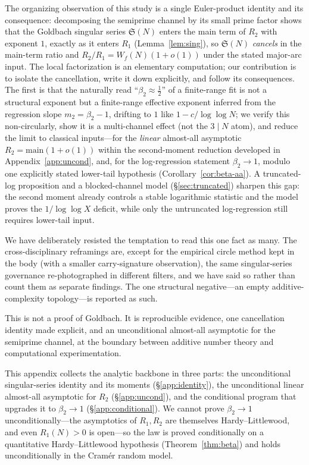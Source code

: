 \documentclass[]{interact}%
\newcommand{\sing}{\mathfrak S}
\begin{document}
The organizing observation of this study is a single Euler-product identity and its
consequence: decomposing the semiprime channel by its small prime factor shows that the
Goldbach singular series $\sing(N)$ enters the main term of $R_2$ with exponent $1$, exactly as
it enters $R_1$ (Lemma~\ref{lem:sing}), so $\sing(N)$ \emph{cancels} in the main-term ratio and
$R_2/R_1=W_f(N)(1+o(1))$ under the stated major-arc input. The local factorization is an
elementary computation; our contribution is to isolate the cancellation, write it down
explicitly, and follow its consequences. The first is that the
naturally read ``$\beta_2\approx\tfrac12$'' of a finite-range fit is not a structural exponent
but a finite-range effective exponent inferred from the regression slope $m_2=\beta_2-1$,
drifting to $1$ like $1-c/\log\log N$; we
verify this non-circularly, show it is a multi-channel effect (not the $3\mid N$ atom),
and reduce the limit to classical inputs---for the \emph{linear} almost-all asymptotic
$R_2=\mathrm{main}(1+o(1))$ within the second-moment reduction developed in
Appendix~\ref{app:uncond}, and, for the log-regression statement $\beta_2\to1$, modulo
one explicitly stated lower-tail hypothesis (Corollary~\ref{cor:beta-aa}). A truncated-log proposition and a blocked-channel model
(\S\ref{sec:truncated}) sharpen this gap: the second moment already controls a stable
logarithmic statistic and the model proves the $1/\log\log X$ deficit, while only the
untruncated log-regression still requires lower-tail input.

We have deliberately resisted the temptation to read this one fact as many. The
cross-disciplinary reframings are, except for the empirical circle method kept in the body (with
a smaller carry-signature observation), the same singular-series governance re-photographed in
different filters, and we have said so rather than count them as separate findings. The one
structural negative---an empty additive-complexity topology---is reported as such.

This is not a proof of Goldbach. It is reproducible evidence, one cancellation identity made
explicit, and an unconditional almost-all asymptotic for the semiprime channel, at the boundary
between additive number theory and computational experimentation.

\appendix

This appendix collects the analytic backbone in three parts: the unconditional
singular-series identity and its moments (\S\ref{app:identity}), the unconditional linear
almost-all asymptotic for $R_2$ (\S\ref{app:uncond}), and the conditional program that
upgrades it to $\beta_2\to1$ (\S\ref{app:conditional}). We cannot prove $\beta_2\to1$
unconditionally---the asymptotics of $R_1,R_2$ are themselves Hardy--Littlewood, and even
$R_1(N)>0$ is open---so the law is proved conditionally on a quantitative Hardy--Littlewood
hypothesis (Theorem~\ref{thm:beta}) and holds unconditionally in the Cram\'er random model.
\end{document}
